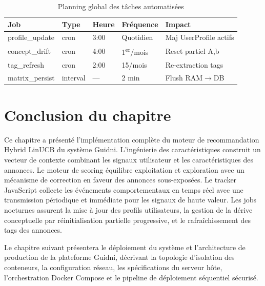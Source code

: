 \begin{table}[H]
    \centering
    \caption{Planning global des tâches automatisées}
    \label{tab:scheduler_jobs}
    \small
    \begin{tabular}{p{3cm} p{1.5cm} p{1.8cm} p{2cm}  p{5cm}}
        \toprule
        \textbf{Job} & \textbf{Type} & \textbf{Heure} & \textbf{Fréquence} &
         \textbf{Impact} \\
        \midrule
        profile\_update & cron & 3:00 & Quotidien & Maj UserProfile actifs \\[2pt]
        concept\_drift & cron & 4:00 & 1\textsuperscript{er}/mois& Reset partiel A,b \\[2pt]
        tag\_refresh & cron & 2:00 & 15/mois & Re-extraction tags \\[2pt]
        matrix\_persist & interval & — & 2 min & Flush RAM$\rightarrow$DB \\
        \bottomrule
    \end{tabular}
\end{table}


\section*{Conclusion du chapitre}

Ce chapitre a présenté l'implémentation complète du moteur de 
recommandation Hybrid LinUCB du système Guidni. L'ingénierie des 
caractéristiques construit un vecteur de contexte combinant les 
signaux utilisateur et les caractéristiques des annonces. Le moteur 
de scoring équilibre exploitation et exploration avec un mécanisme 
de correction en faveur des annonces sous-exposées. Le tracker 
JavaScript collecte les événements comportementaux en temps réel avec 
une transmission périodique et immédiate pour les signaux de haute 
valeur. Les jobs nocturnes assurent la mise à jour des profils 
utilisateurs, la gestion de la dérive conceptuelle par réinitialisation 
partielle progressive, et le rafraîchissement des tags des annonces.

Le chapitre suivant présentera le déploiement du système et l'architecture de production de la plateforme Guidni, décrivant la topologie d'isolation des conteneurs, la configuration réseau, les spécifications du serveur hôte, l'orchestration Docker Compose et le pipeline de déploiement séquentiel sécurisé.
